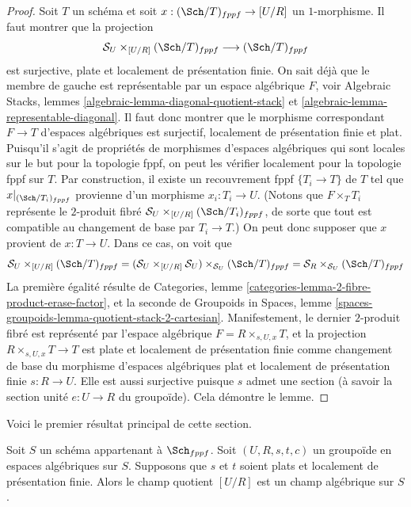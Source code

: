 \begin{proof}
Soit $T$ un schéma et soit $x : (\Sch/T)_{fppf} \to [U/R]$
un $1$-morphisme. Il faut montrer que la projection
$$
\mathcal{S}_U \times_{[U/R]} (\Sch/T)_{fppf}
\longrightarrow
(\Sch/T)_{fppf}
$$
est surjective, plate et localement de présentation finie.
On sait déjà que le membre de gauche
est représentable par un espace algébrique $F$, voir
Algebraic Stacks, lemmes \ref{algebraic-lemma-diagonal-quotient-stack} et
\ref{algebraic-lemma-representable-diagonal}.
Il faut donc montrer que le morphisme correspondant $F \to T$ d'espaces
algébriques est surjectif, localement de présentation finie et plat.
Puisqu'il s'agit de propriétés de morphismes d'espaces
algébriques qui sont locales sur le but pour la topologie fppf, on
peut les vérifier localement pour la topologie fppf sur $T$. Par construction, il existe
un recouvrement fppf $\{T_i \to T\}$ de $T$ tel que
$x|_{(\Sch/T_i)_{fppf}}$ provienne d'un morphisme
$x_i : T_i \to U$. (Notons que $F \times_T T_i$ représente le
$2$-produit fibré $\mathcal{S}_U \times_{[U/R]} (\Sch/T_i)_{fppf}$,
de sorte que tout est compatible au changement de base par $T_i \to T$.)
On peut donc supposer que $x$ provient de $x : T \to U$.
Dans ce cas, on voit que
$$
\mathcal{S}_U \times_{[U/R]} (\Sch/T)_{fppf}
=
(\mathcal{S}_U \times_{[U/R]} \mathcal{S}_U)
\times_{\mathcal{S}_U} (\Sch/T)_{fppf}
=
\mathcal{S}_R \times_{\mathcal{S}_U} (\Sch/T)_{fppf}
$$
La première égalité résulte de
Categories, lemme \ref{categories-lemma-2-fibre-product-erase-factor},
et la seconde de
Groupoids in Spaces,
lemme \ref{spaces-groupoids-lemma-quotient-stack-2-cartesian}.
Manifestement, le dernier $2$-produit fibré est représenté par l'espace
algébrique $F = R \times_{s, U, x} T$, et la projection
$R \times_{s, U, x} T \to T$ est plate et localement de présentation finie
comme changement de base du morphisme d'espaces algébriques
plat et localement de présentation finie $s : R \to U$.
Elle est aussi surjective puisque $s$ admet une section (à savoir la section unité
$e : U \to R$ du groupoïde).
Cela démontre le lemme.
\end{proof}

\noindent
Voici le premier résultat principal de cette section.

\begin{theorem}
\label{theorem-flat-groupoid-gives-algebraic-stack}
Soit $S$ un schéma appartenant à $\Sch_{fppf}$.
Soit $(U, R, s, t, c)$ un groupoïde en espaces algébriques sur $S$.
Supposons que $s$ et $t$ soient plats et localement de présentation finie.
Alors le champ quotient $[U/R]$ est un champ algébrique sur $S$.
\end{theorem}

